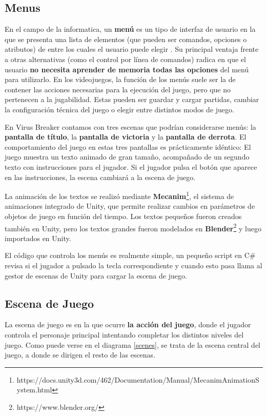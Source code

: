 \subsection{Menus}
En el campo de la informatica, un \textbf{menú} es un tipo de interfaz de usuario en la que se presenta una lista de elementos (que pueden ser comandos, opciones o atributos) de entre los cuales el usuario puede elegir \cite{apple_ui}. Su principal ventaja frente a otras alternativas (como el control por línea de comandos) radica en que el usuario \textbf{no necesita aprender de memoria todas las opciones} del menú para utilizarlo. En los videojuegos, la función de los menús suele ser la de contener las acciones necesarias para la ejecución del juego, pero que no pertenecen a la jugabilidad. Estas pueden ser guardar y cargar partidas, cambiar la configuración técnica del juego o elegir entre distintos modos de juego.

En Virus Breaker contamos con tres escenas que podrían considerarse menús: la \textbf{pantalla de título}, la \textbf{pantalla de victoria} y la \textbf{pantalla de derrota}. El comportamiento del juego en estas tres pantallas es prácticamente idéntico: El juego muestra un texto animado de gran tamaño, acompañado de un segundo texto con instrucciones para el jugador. Si el jugador pulsa el botón que aparece en las instrucciones, la escena cambiará a la escena de juego.

La animación de los textos se realizó mediante \textbf{Mecanim}\footnote{https://docs.unity3d.com/462/Documentation/Manual/MecanimAnimationSystem.html}, el sistema de animaciones integrado de Unity, que permite realizar cambios en parámetros de objetos de juego en función del tiempo. Los textos pequeños fueron creados también en Unity, pero los textos grandes fueron modelados en \textbf{Blender}\footnote{https://www.blender.org/} y luego importados en Unity.

El código que controla los menús es realmente simple, un pequeño script en C\# revisa si el jugador a pulsado la tecla correspondiente y cuando esto pasa llama al gestor de escenas de Unity para cargar la escena de juego.

\subsection{Escena de Juego}
La escena de juego es en la que ocurre \textbf{la acción del juego}, donde el jugador controla el personaje principal intentando completar los distintos niveles del juego. Como puede verse en el diagrama \ref{scenes}, se trata de la escena central del juego, a donde se dirigen el resto de las escenas. 

